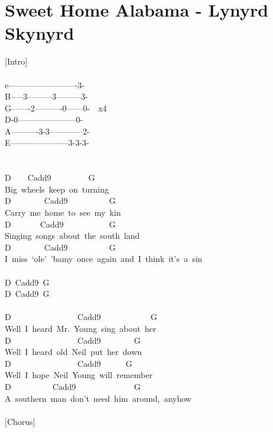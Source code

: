 \documentclass[]{book}
\let\stdsection\section
\renewcommand\section{\clearpage\stdsection}
\begin{document}
\hypertarget{sweet-home-alabama---lynyrd-skynyrd}{%
\section{Sweet Home Alabama - Lynyrd Skynyrd}\label{sweet-home-alabama---lynyrd-skynyrd}}

{[}Intro{]}\\
~\\
e\textbar-------------------------3-\textbar{}\\
B\textbar-----3---------3---------3-\textbar{}\\
G\textbar-------2----------0------0-\textbar~~x4\\
D-0---------------------0-\textbar~~~~~\\
A\textbar----------3-3------------2-\textbar{}\\
E\textbar---------------------3-3-3-\textbar{}\\
~\\
~\\
D~~~~Cadd9~~~~~~~~~G\\
Big~wheels~keep~on~turning\\
D~~~~~~~~Cadd9~~~~~~~~~~G\\
Carry~me~home~to~see~my~kin\\
D~~~~~~~Cadd9~~~~~~~~~~~G\\
Singing~songs~about~the~south~land\\
D~~~~~~~~Cadd9~~~~~~~~~~G~~~~~~~~~~~~~~~~~~~~~~~~~~~~\\
I~miss~`ole'~'bamy~once~again~and~I~think~it's~a~sin\\
~\\
D~Cadd9~G~\\
D~Cadd9~G~\\
~\\
D~~~~~~~~~~~~~~~~Cadd9~~~~~~~~~~~~G\\
Well~I~heard~Mr.~Young~sing~about~her\\
D~~~~~~~~~~~~~~~~Cadd9~~~~~~~~G\\
Well~I~heard~old~Neil~put~her~down\\
D~~~~~~~~~~~~~~~~Cadd9~~~~~~G\\
Well~I~hope~Neil~Young~will~remember\\
D~~~~~~~~~~Cadd9~~~~~~~~~~~~~~G~~~~~~~~~~~~~~~~\\
A~southern~man~don't~need~him~around,~anyhow\\
~\\
{[}Chorus{]}\\
\end{document}
